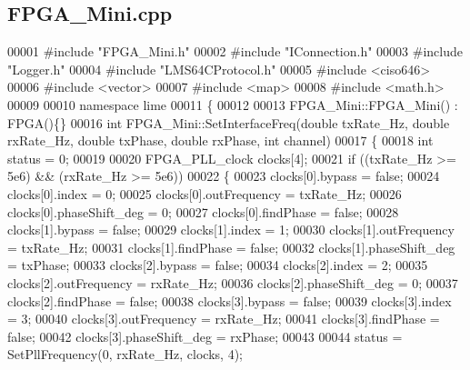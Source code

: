 \subsection{F\+P\+G\+A\+\_\+\+Mini.\+cpp}
\label{FPGA__Mini_8cpp_source}

\begin{DoxyCode}
00001 \textcolor{preprocessor}{#include "FPGA_Mini.h"}
00002 \textcolor{preprocessor}{#include "IConnection.h"}
00003 \textcolor{preprocessor}{#include "Logger.h"}
00004 \textcolor{preprocessor}{#include "LMS64CProtocol.h"}
00005 \textcolor{preprocessor}{#include <ciso646>}
00006 \textcolor{preprocessor}{#include <vector>}
00007 \textcolor{preprocessor}{#include <map>}
00008 \textcolor{preprocessor}{#include <math.h>}
00009 
00010 \textcolor{keyword}{namespace }lime
00011 \{
00012 
00013 FPGA_Mini::FPGA_Mini() : FPGA()\{\}
00016 \textcolor{keywordtype}{int} FPGA_Mini::SetInterfaceFreq(\textcolor{keywordtype}{double} txRate\_Hz, \textcolor{keywordtype}{double} rxRate\_Hz, \textcolor{keywordtype}{double} txPhase, \textcolor{keywordtype}{double} rxPhase, \textcolor{keywordtype}{int} 
      channel)
00017 \{
00018     \textcolor{keywordtype}{int} status = 0;
00019 
00020     FPGA_PLL_clock clocks[4];
00021     \textcolor{keywordflow}{if} ((txRate\_Hz >= 5e6) && (rxRate\_Hz >= 5e6))
00022     \{
00023         clocks[0].bypass = \textcolor{keyword}{false};
00024         clocks[0].index = 0;
00025         clocks[0].outFrequency = txRate\_Hz;
00026         clocks[0].phaseShift_deg = 0;
00027         clocks[0].findPhase = \textcolor{keyword}{false};
00028         clocks[1].bypass = \textcolor{keyword}{false};
00029         clocks[1].index = 1;
00030         clocks[1].outFrequency = txRate\_Hz;
00031         clocks[1].findPhase = \textcolor{keyword}{false};
00032         clocks[1].phaseShift_deg = txPhase;
00033         clocks[2].bypass = \textcolor{keyword}{false};
00034         clocks[2].index = 2;
00035         clocks[2].outFrequency = rxRate\_Hz;
00036         clocks[2].phaseShift_deg = 0;
00037         clocks[2].findPhase = \textcolor{keyword}{false};
00038         clocks[3].bypass = \textcolor{keyword}{false};
00039         clocks[3].index = 3;
00040         clocks[3].outFrequency = rxRate\_Hz;
00041         clocks[3].findPhase = \textcolor{keyword}{false};
00042         clocks[3].phaseShift_deg = rxPhase;
00043 
00044         status = SetPllFrequency(0, rxRate\_Hz, clocks, 4);

\end{DoxyCode}
